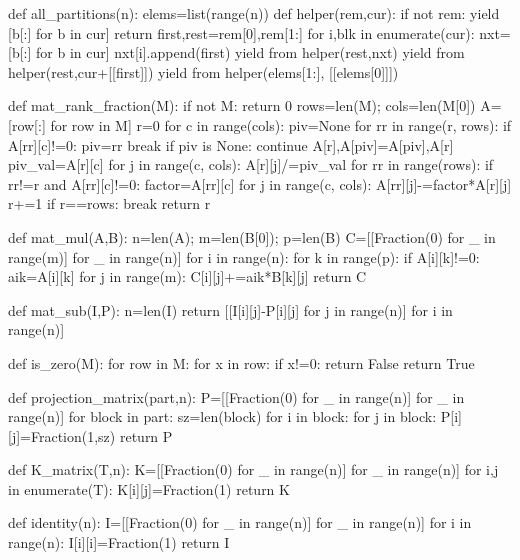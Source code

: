def all_partitions(n):
    elems=list(range(n))
    def helper(rem,cur):
        if not rem:
            yield [b[:] for b in cur]
            return
        first,rest=rem[0],rem[1:]
        for i,blk in enumerate(cur):
            nxt=[b[:] for b in cur]
            nxt[i].append(first)
            yield from helper(rest,nxt)
        yield from helper(rest,cur+[[first]])
    yield from helper(elems[1:], [[elems[0]]])

def mat_rank_fraction(M):
    if not M: return 0
    rows=len(M); cols=len(M[0])
    A=[row[:] for row in M]
    r=0
    for c in range(cols):
        piv=None
        for rr in range(r, rows):
            if A[rr][c]!=0:
                piv=rr
                break
        if piv is None:
            continue
        A[r],A[piv]=A[piv],A[r]
        piv_val=A[r][c]
        for j in range(c, cols):
            A[r][j]/=piv_val
        for rr in range(rows):
            if rr!=r and A[rr][c]!=0:
                factor=A[rr][c]
                for j in range(c, cols):
                    A[rr][j]-=factor*A[r][j]
        r+=1
        if r==rows:
            break
    return r

def mat_mul(A,B):
    n=len(A); m=len(B[0]); p=len(B)
    C=[[Fraction(0) for _ in range(m)] for _ in range(n)]
    for i in range(n):
        for k in range(p):
            if A[i][k]!=0:
                aik=A[i][k]
                for j in range(m):
                    C[i][j]+=aik*B[k][j]
    return C

def mat_sub(I,P):
    n=len(I)
    return [[I[i][j]-P[i][j] for j in range(n)] for i in range(n)]

def is_zero(M):
    for row in M:
        for x in row:
            if x!=0:
                return False
    return True

def projection_matrix(part,n):
    P=[[Fraction(0) for _ in range(n)] for _ in range(n)]
    for block in part:
        sz=len(block)
        for i in block:
            for j in block:
                P[i][j]=Fraction(1,sz)
    return P

def K_matrix(T,n):
    K=[[Fraction(0) for _ in range(n)] for _ in range(n)]
    for i,j in enumerate(T):
        K[i][j]=Fraction(1)
    return K

def identity(n):
    I=[[Fraction(0) for _ in range(n)] for _ in range(n)]
    for i in range(n):
        I[i][i]=Fraction(1)
    return I

